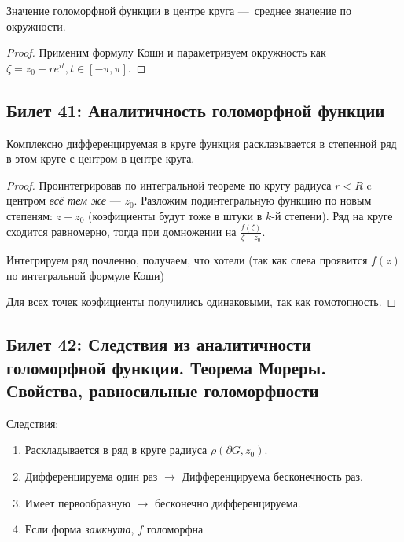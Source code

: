 \documentclass[12pt, a4paper, oneside]{memoir}
\begin{document}
\begin{corollary}
     Значение голоморфной функции в центре круга — среднее значение по окружности.

    \begin{proof}
        Применим формулу Коши и параметризуем окружность как $\zeta = z_0 + re^{it}, t \in [-\pi, \pi]$.
    \end{proof}
\end{corollary}

\subsection{Билет 41: Аналитичность голоморфной функции}

\begin{theorem}
    Комплексно дифференцируемая в круге функция 
    расклазывается в степенной ряд в этом круге
    с центром в центре круга.

    \begin{proof}
        Проинтегрировав по интегральной теореме по кругу радиуса $r < R$ c центром \textit{всё тем же} — $z_0$. Разложим подинтегральную функцию по новым степеням: $z - z_0$ (коэфициенты будут тоже в штуки в $k$-й степени).
        Ряд на круге сходится равномерно, тогда при домножении на $\frac{f(\zeta)}{\zeta - z_0}$.

        Интегрируем ряд почленно, получаем, что хотели (так как слева проявится $f(z)$ по интегральной формуле Коши)
        
        Для всех точек коэфициенты получились одинаковыми, так как гомотопность.
    \end{proof}
\end{theorem}


\subsection{Билет 42: Следствия из аналитичности голоморфной функции. Теорема Мореры. Свойства, равносильные голоморфности}

Следствия:

\begin{enumerate}
    \item Раскладывается в ряд в круге радиуса $\rho(\partial G, z_0)$.
    \item Дифференцируема один раз $→$ Дифференцируема бесконечность раз.
    \item Имеет первообразную $→$ бесконечно дифференцируема.
    \item Если форма \textit{замкнута}, $f$ голоморфна 
\end{enumerate}
\end{document}
